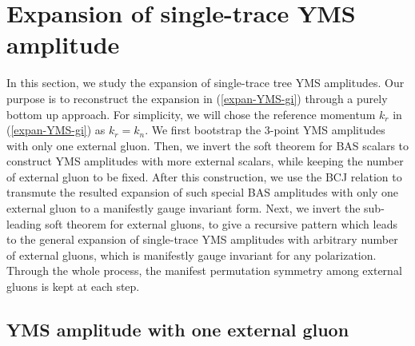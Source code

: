 \documentclass[preprint,showpacs,onecolumn,nofootinbib]{revtex4}
\def\eref#1{(\ref{#1})}
\begin{document}
\section{Expansion of single-trace YMS amplitude}
\label{sec-expan-YMS}

In this section, we study the expansion of single-trace tree YMS amplitudes.
Our purpose is to reconstruct the expansion in \eref{expan-YMS-gi} through a purely bottom up approach. For simplicity, we will chose the reference momentum $k_r$ in \eref{expan-YMS-gi} as $k_r=k_n$. We first bootstrap the $3$-point YMS amplitudes with only one external gluon. Then, we invert the soft theorem for BAS scalars to construct YMS amplitudes with more external scalars, while keeping the number of external gluon to be fixed. After this construction, we use the BCJ relation to transmute the resulted expansion of such special BAS amplitudes with only one external gluon to a manifestly gauge invariant form. Next, we invert the sub-leading soft theorem for external gluons, to give a recursive pattern which leads to the general expansion of single-trace YMS amplitudes with arbitrary number of external gluons,
which is manifestly gauge invariant for any polarization. Through the whole process, the manifest permutation symmetry among external gluons is kept at each step.



\subsection{YMS amplitude with one external gluon}
\label{subsec-1gluon}
\end{document}
